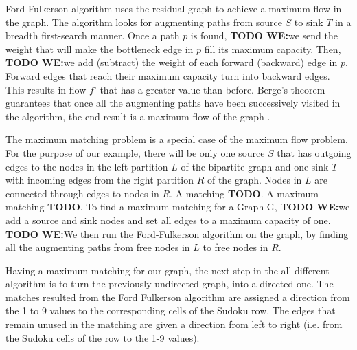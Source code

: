 \documentclass{l4proj}
\begin{document}
\noindent Ford-Fulkerson algorithm uses the residual graph to achieve a maximum flow in the graph. The algorithm looks for augmenting paths from source $S$ to sink $T$ in a breadth first-search manner. Once a path $p$ is found, \textbf{TODO WE:}we send the weight that will make the bottleneck edge in $p$ fill its maximum capacity. Then, \textbf{TODO WE:}we add (subtract) the weight of each forward (backward) edge in $p$. Forward edges that reach their maximum capacity turn into backward edges. This results in flow $f’$ that has a greater value than before. Berge’s theorem guarantees that once all the augmenting paths have been successively visited in the algorithm, the end result is a maximum flow of the graph \cite{berge1957two}.

\noindent The maximum matching problem is a special case of the maximum flow problem. For the purpose of our example, there will be only one source $S$ that has outgoing edges to the nodes in the left partition $L$ of the bipartite graph and one sink $T$ with incoming edges from the right partition $R$ of the graph. Nodes in $L$ are connected through edges to nodes in $R$. A matching \textbf{TODO}. A maximum matching \textbf{TODO}. To find a maximum matching for a Graph G, \textbf{TODO WE:}we add a source and sink nodes and set all edges to a maximum capacity of one. \textbf{TODO WE:}We then run the Ford-Fulkerson algorithm on the graph, by finding all the augmenting paths from free nodes in $L$ to free nodes in $R$.



\noindent Having a maximum matching for our graph, the next step in the all-different algorithm is to turn the previously undirected graph, into a directed one. The matches resulted from the Ford Fulkerson algorithm are assigned a direction from the 1 to 9 values to the corresponding cells of the Sudoku row. The edges that remain unused in the matching are given a direction from left to right (i.e. from the Sudoku cells of the row to the 1-9 values).
\end{document}

